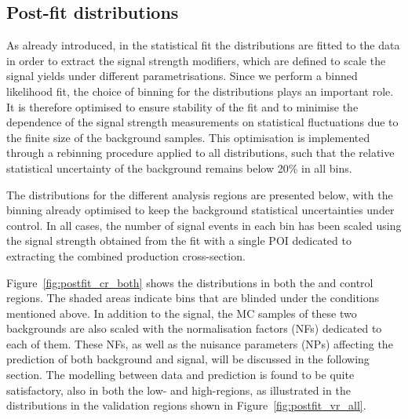 \subsection{Post-fit distributions}
\label{post_fit}

As already introduced, in the statistical fit the \mtt distributions are fitted to the data in order to extract the signal strength modifiers, which are defined to scale the signal yields under different parametrisations. Since we perform a binned likelihood fit, the choice of binning for the \mtt distributions plays an important role. It is therefore optimised to ensure stability of the fit and to minimise the dependence of the signal strength measurements on statistical fluctuations due to the finite size of the background samples. This optimisation is implemented through a rebinning procedure applied to all distributions, such that the relative statistical uncertainty of the background remains below 20\% in all bins.

The \mtt distributions for the different analysis regions are presented below, with the binning already optimised to keep the background statistical uncertainties under control. In all cases, the number of signal events in each bin has been scaled using the signal strength obtained from the fit with a single POI dedicated to extracting the combined production cross-section.

Figure~\ref{fig:postfit_cr_both} shows the \mtt distributions in both the \ztautau and \ttbar control regions. The shaded areas indicate bins that are blinded under the conditions mentioned above. In addition to the signal, the MC samples of these two backgrounds are also scaled with the normalisation factors (NFs) dedicated to each of them. These NFs, as well as the nuisance parameters (NPs) affecting the prediction of both background and signal, will be discussed in the following section. The modelling between data and prediction is found to be quite satisfactory, also in both the low- and high-\pth regions, as illustrated in the \mtt distributions in the validation regions shown in Figure~\ref{fig:postfit_vr_all}.


